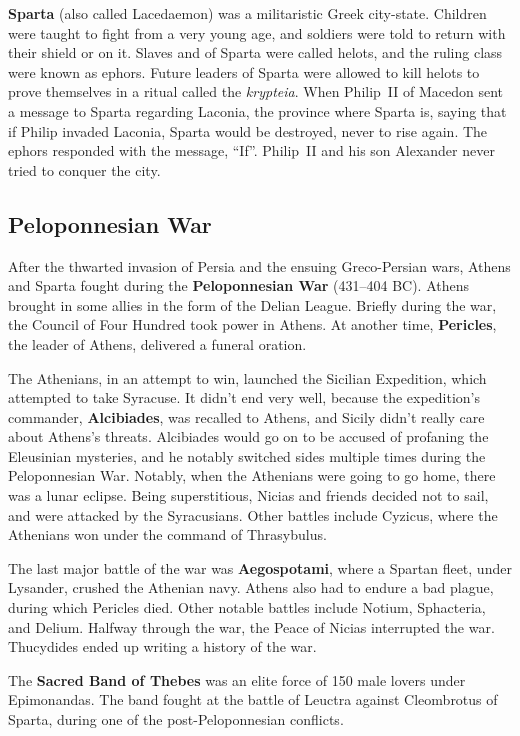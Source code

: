 \textbf{Sparta} (also called Lacedaemon) was a militaristic Greek city-state.
Children were taught to fight from a very young age,
and soldiers were told to return with their shield or on it.
Slaves and of Sparta were called helots, and the ruling class were known as ephors.
Future leaders of Sparta were allowed to kill helots to prove themselves in a ritual called the \textit{krypteia}.
When Philip~II of Macedon sent a message to Sparta regarding Laconia, the province where Sparta is,
saying that if Philip invaded Laconia, Sparta would be destroyed, never to rise again.
The ephors responded with the message, ``If''.
Philip~II and his son Alexander never tried to conquer the city.

\subsection*{Peloponnesian War}

After the thwarted invasion of Persia and the ensuing Greco-Persian wars,
Athens and Sparta fought during the \textbf{Peloponnesian War} (431--404 BC).
Athens brought in some allies in the form of the Delian League.
Briefly during the war, the Council of Four Hundred took power in Athens.
At another time, \textbf{Pericles}, the leader of Athens, delivered a funeral oration.

The Athenians, in an attempt to win, launched the Sicilian Expedition, which attempted to take Syracuse.
It didn't end very well, because the expedition's commander, \textbf{Alcibiades}, was recalled to Athens,
and Sicily didn't really care about Athens's threats.
Alcibiades would go on to be accused of profaning the Eleusinian mysteries,
and he notably switched sides multiple times during the Peloponnesian War.
Notably, when the Athenians were going to go home, there was a lunar eclipse.
Being superstitious, Nicias and friends decided not to sail, and were attacked by the Syracusians.
Other battles include Cyzicus, where the Athenians won under the command of Thrasybulus.

The last major battle of the war was \textbf{Aegospotami}, where a Spartan fleet,
under Lysander, crushed the Athenian navy.
Athens also had to endure a bad plague, during which Pericles died.
Other notable battles include Notium, Sphacteria, and Delium.
Halfway through the war, the Peace of Nicias interrupted the war.
Thucydides ended up writing a history of the war.

The \textbf{Sacred Band of Thebes} was an elite force of 150 male lovers under Epimonandas.
The band fought at the battle of Leuctra against Cleombrotus of Sparta, during one of the post-Peloponnesian conflicts.

